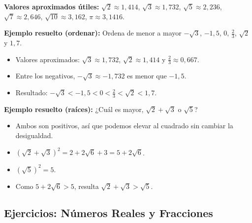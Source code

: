 \documentclass[12pt, letterpaper]{article}
\begin{document}
\begin{cuadroinfo}
  \small
  \textbf{Valores aproximados útiles:} $\sqrt{2} \approx 1{,}414$, \quad $\sqrt{3} \approx 1{,}732$, \quad $\sqrt{5} \approx 2{,}236$, \quad $\sqrt{7} \approx 2{,}646$, \quad $\sqrt{10} \approx 3{,}162$, \quad $\pi \approx 3{,}1416$.
\end{cuadroinfo}

\noindent\textbf{Ejemplo resuelto (ordenar):} Ordena de menor a mayor $-\sqrt{3}$, $-1{,}5$, $0$, $\frac{2}{3}$, $\sqrt{2}$ y $1{,}7$.
\begin{itemize}
  \item Valores aproximados: $\sqrt{3} \approx 1{,}732$, $\sqrt{2} \approx 1{,}414$ y $\frac{2}{3} \approx 0{,}667$.
  \item Entre los negativos, $-\sqrt{3} \approx -1{,}732$ es menor que $-1{,}5$.
  \item Resultado: $-\sqrt{3} < -1{,}5 < 0 < \frac{2}{3} < \sqrt{2} < 1{,}7$.
\end{itemize}

\noindent\textbf{Ejemplo resuelto (raíces):} ¿Cuál es mayor, $\sqrt{2} + \sqrt{3}$ o $\sqrt{5}$?
\begin{itemize}
  \item Ambos son positivos, así que podemos elevar al cuadrado sin cambiar la desigualdad.
  \item $(\sqrt{2} + \sqrt{3})^2 = 2 + 2\sqrt{6} + 3 = 5 + 2\sqrt{6}$.
  \item $(\sqrt{5})^2 = 5$.
  \item Como $5 + 2\sqrt{6} > 5$, resulta $\sqrt{2} + \sqrt{3} > \sqrt{5}$.
\end{itemize}

\subsection{Ejercicios: Números Reales y Fracciones}
\end{document}
